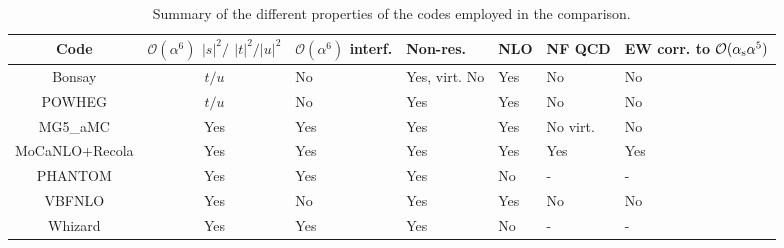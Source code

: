 \begin{table*}[ht!]
    \footnotesize
    \begin{tabularx}{\textwidth}{c|c|X|X|X|X|X}
        Code  &  $\mathcal O(\alpha^6)$ $|s|^2/$ $|t|^2/|u|^2$  &  $\mathcal O(\alpha^6)$ interf.  &  Non-res.  & NLO &  NF QCD  &  EW corr. to $\mathcal O(\alpha_\text{s} \alpha^5)$  \\
        \hline
        \hline
        {\sc Bonsay}        &  $t/u$    &  No       &  Yes, virt. No    &  Yes   & No       &  No  \\
        {\sc POWHEG}        &  $t/u$    &  No       &  Yes              &  Yes   & No       &  No  \\
        {\sc MG5\_aMC}      &  Yes      &  Yes      &  Yes              &  Yes   & No virt. &  No \\
        {\sc MoCaNLO+Recola}&  Yes      &  Yes      &  Yes              &  Yes   & Yes      &  Yes  \\
        {\sc PHANTOM}       &  Yes      &  Yes      &  Yes              &  No    & -        & - \\
        {\sc VBFNLO}        &  Yes      &  No       &  Yes              &  Yes   & No       &  No  \\
        {\sc Whizard}       &  Yes      &  Yes      &  Yes              &  No    & -        & - \\
    \end{tabularx}
    \caption{\label{tab:wg1_codes} Summary of the different properties of the codes employed in the comparison.}
\end{table*}
